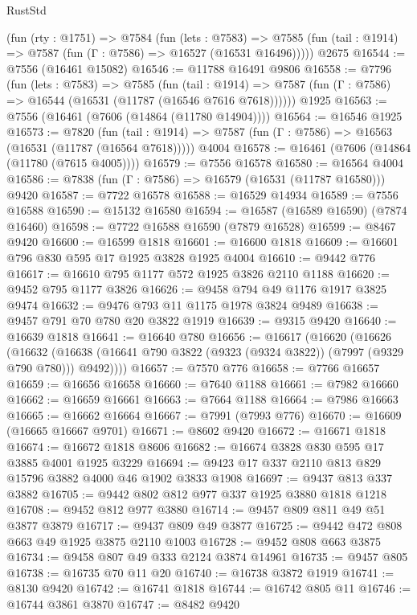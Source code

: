 \begin{lexlean}{RustStd}
\begin{coremodule}
{\begin{coremodule}
{{{{{{{{{{{{{{{{{{{{{{{{{{{{{{{{{{{{{{{{{{{    (fun (rty : @1751) =>
    @7584
      (fun (lets : @7583) =>
      @7585 (fun (tail : @1914) => @7587 (fun (Γ : @7586) => @16527 (@16531 @16496)))))
    @2675
@16544 := @7556 (@16461 @15082)
@16546 := @11788 @16491 @9806
@16558 := @7796
    (fun (lets : @7583) =>
    @7585
      (fun (tail : @1914) =>
      @7587 (fun (Γ : @7586) => @16544 (@16531 (@11787 (@16546 @7616 @7618))))))
    @1925
@16563 := @7556 (@16461 (@7606 (@14864 (@11780 @14904))))
@16564 := @16546 @1925
@16573 := @7820
    (fun (tail : @1914) => @7587 (fun (Γ : @7586) => @16563 (@16531 (@11787 (@16564 @7618)))))
    @4004
@16578 := @16461 (@7606 (@14864 (@11780 (@7615 @4005))))
@16579 := @7556 @16578
@16580 := @16564 @4004
@16586 := @7838 (fun (Γ : @7586) => @16579 (@16531 (@11787 @16580))) @9420
@16587 := @7722 @16578
@16588 := @16529 @14934
@16589 := @7556 @16588
@16590 := @15132 @16580
@16594 := @16587 (@16589 @16590) (@7874 @16460)
@16598 := @7722 @16588 @16590 (@7879 @16528)
@16599 := @8467 @9420
@16600 := @16599 @1818
@16601 := @16600 @1818
@16609 := @16601 @796 @830 @595 @17 @1925 @3828 @1925 @4004
@16610 := @9442 @776
@16617 := @16610 @795 @1177 @572 @1925 @3826 @2110 @1188
@16620 := @9452 @795 @1177 @3826
@16626 := @9458 @794 @49 @1176 @1917 @3825 @9474
@16632 := @9476 @793 @11 @1175 @1978 @3824 @9489
@16638 := @9457 @791 @70 @780 @20 @3822 @1919
@16639 := @9315 @9420
@16640 := @16639 @1818
@16641 := @16640 @780
@16656 := @16617
    (@16620
      (@16626
        (@16632
          (@16638 (@16641 @790 @3822 (@9323 (@9324 @3822)) (@7997 (@9329 @790 @780))) @9492))))
@16657 := @7570 @776
@16658 := @7766 @16657
@16659 := @16656 @16658
@16660 := @7640 @1188
@16661 := @7982 @16660
@16662 := @16659 @16661
@16663 := @7664 @1188
@16664 := @7986 @16663
@16665 := @16662 @16664
@16667 := @7991 (@7993 @776)
@16670 := @16609 (@16665 @16667 @9701)
@16671 := @8602 @9420
@16672 := @16671 @1818
@16674 := @16672 @1818 @8606
@16682 := @16674 @3828 @830 @595 @17 @3885 @4001 @1925 @3229
@16694 := @9423 @17 @337 @2110 @813 @829 @15796 @3882 @4000 @46 @1902 @3833 @1908
@16697 := @9437 @813 @337 @3882
@16705 := @9442 @802 @812 @977 @337 @1925 @3880 @1818 @1218
@16708 := @9452 @812 @977 @3880
@16714 := @9457 @809 @811 @49 @51 @3877 @3879
@16717 := @9437 @809 @49 @3877
@16725 := @9442 @472 @808 @663 @49 @1925 @3875 @2110 @1003
@16728 := @9452 @808 @663 @3875
@16734 := @9458 @807 @49 @333 @2124 @3874 @14961
@16735 := @9457 @805
@16738 := @16735 @70 @11 @20
@16740 := @16738 @3872 @1919
@16741 := @8130 @9420
@16742 := @16741 @1818
@16744 := @16742 @805 @11
@16746 := @16744 @3861 @3870
@16747 := @8482 @9420
}}}}}}}}}}}}}}}}}}}}}}}}}}}}}}}}}}}}}}}}}}}
\end{coremodule}}
\end{coremodule}
\end{lexlean}
